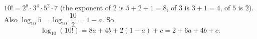 $10!=2^8\cdot3^4\cdot5^2\cdot7$ (the exponent of $2$ is $5+2+1=8$, of $3$ is $3+1=4$, of $5$ is $2$). Also $\log_{10}5=\log_{10}\dfrac{10}{2}=1-a$. So
\[\log_{10}(10!)=8a+4b+2(1-a)+c=\boxed{2+6a+4b+c}.\]
